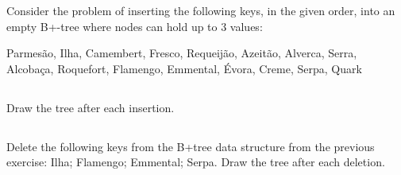 
	{\color{gray}Consider the problem of inserting the following keys, in the given order, into an empty B+-tree where nodes can hold up to 3 values:}
	
	{\color{gray}Parmesão, Ilha, Camembert, Fresco, Requeijão, Azeitão, Alverca, Serra, Alcobaça, Roquefort, Flamengo, Emmental, Évora, Creme, Serpa, Quark}

	\subsection{}
	{\color{gray}Draw the tree after each insertion.}


	\subsection{}
	{\color{gray}Delete the following keys from the B+tree data structure from the previous exercise: Ilha; Flamengo; Emmental; Serpa. Draw the tree after each deletion.}
